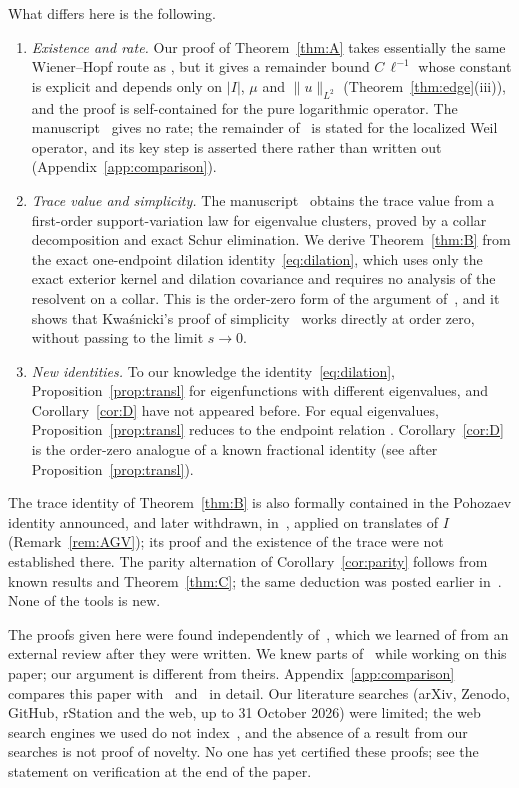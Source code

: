 \documentclass[11pt]{amsart}
\theoremstyle{definition}
\theoremstyle{remark}
\numberwithin{equation}{section}
\begin{document}
What differs here is the following.
\begin{enumerate}
\item[(a)] \emph{Existence and rate.} Our proof of Theorem~\ref{thm:A} takes essentially the same Wiener--Hopf route as \cite[\S3.3]{BT26}, but it gives a remainder bound $C\,\ell^{-1}$ whose constant is explicit and depends only on $|I|$, $\mu$ and $\|u\|_{L^2}$ (Theorem~\ref{thm:edge}(iii)), and the proof is self-contained for the pure logarithmic operator. The manuscript~\cite{BT26} gives no rate; the remainder of~\cite{Mathia26} is stated for the localized Weil operator, and its key step is asserted there rather than written out (Appendix~\ref{app:comparison}).
\item[(b)] \emph{Trace value and simplicity.} The manuscript~\cite{BT26} obtains the trace value from a first-order support-variation law for eigenvalue clusters, proved by a collar decomposition and exact Schur elimination. We derive Theorem~\ref{thm:B} from the exact one-endpoint dilation identity~\eqref{eq:dilation}, which uses only the exact exterior kernel and dilation covariance and requires no analysis of the resolvent on a collar. This is the order-zero form of the argument of~\cite{RS14,Kw23}, and it shows that Kwa\'snicki's proof of simplicity~\cite{Kw23} works directly at order zero, without passing to the limit $s\to0$.
\item[(c)] \emph{New identities.} To our knowledge the identity~\eqref{eq:dilation}, Proposition~\ref{prop:transl} for eigenfunctions with different eigenvalues, and Corollary~\ref{cor:D} have not appeared before. For equal eigenvalues, Proposition~\ref{prop:transl} reduces to the endpoint relation \cite[(6.3)]{BT26}. Corollary~\ref{cor:D} is the order-zero analogue of a known fractional identity (see after Proposition~\ref{prop:transl}).
\end{enumerate}
The trace identity of Theorem~\ref{thm:B} is also formally contained in the Pohozaev identity announced, and later withdrawn, in~\cite{AGV24}, applied on translates of $I$ (Remark~\ref{rem:AGV}); its proof and the existence of the trace were not established there. The parity alternation of Corollary~\ref{cor:parity} follows from known results and Theorem~\ref{thm:C}; the same deduction was posted earlier in~\cite{BT26c}. None of the tools is new.

The proofs given here were found independently of~\cite{BT26}, which we learned of from an external review after they were written. We knew parts of~\cite{Mathia26} while working on this paper; our argument is different from theirs. Appendix~\ref{app:comparison} compares this paper with~\cite{BT26} and~\cite{Mathia26} in detail. Our literature searches (arXiv, Zenodo, GitHub, rStation and the web, up to 31 October 2026) were limited; the web search engines we used do not index~\cite{BT26}, and the absence of a result from our searches is not proof of novelty. No one has yet certified these proofs; see the statement on verification at the end of the paper.
\end{document}
